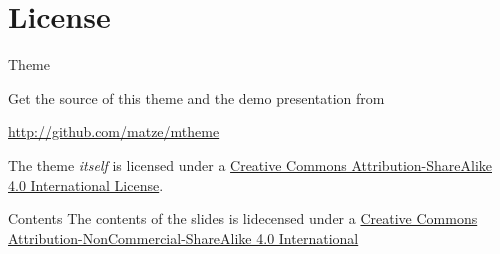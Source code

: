 \documentclass[10pt, compress]{beamer}
\begin{document}
\section{License}
\begin{frame}{Theme}

  Get the source of this theme and the demo presentation from

  \begin{center}\url{http://github.com/matze/mtheme}\end{center}

  The theme \emph{itself} is licensed under a
  \href{http://creativecommons.org/licenses/by-sa/4.0/}{Creative Commons
  Attribution-ShareAlike 4.0 International License}.

  \begin{center}\ccbysa\end{center}

\end{frame}

\begin{frame}{Contents}
	The contents of the slides is lidecensed under a \href{http://creativecommons.org/licenses/by-nc-sa/4.0/}{Creative Commons Attribution-NonCommercial-ShareAlike 4.0 International}
	\begin{center}\ccbyncsa\end{center}
\end{frame}

\end{document}

